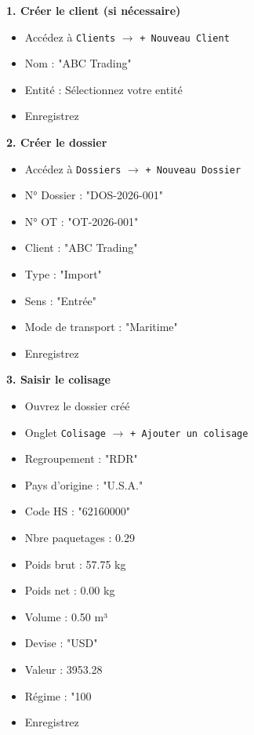 \documentclass[12pt,a4paper]{report}
\begin{document}
\textbf{1. Créer le client (si nécessaire)}

\begin{itemize}[leftmargin=*]
    \item Accédez à \texttt{Clients} $\rightarrow$ \texttt{+ Nouveau Client}
    \item Nom : "ABC Trading"
    \item Entité : Sélectionnez votre entité
    \item Enregistrez
\end{itemize}

\textbf{2. Créer le dossier}

\begin{itemize}[leftmargin=*]
    \item Accédez à \texttt{Dossiers} $\rightarrow$ \texttt{+ Nouveau Dossier}
    \item N° Dossier : "DOS-2026-001"
    \item N° OT : "OT-2026-001"
    \item Client : "ABC Trading"
    \item Type : "Import"
    \item Sens : "Entrée"
    \item Mode de transport : "Maritime"
    \item Enregistrez
\end{itemize}

\textbf{3. Saisir le colisage}

\begin{itemize}[leftmargin=*]
    \item Ouvrez le dossier créé
    \item Onglet \texttt{Colisage} $\rightarrow$ \texttt{+ Ajouter un colisage}
    \item Regroupement : "RDR"
    \item Pays d'origine : "U.S.A."
    \item Code HS : "62160000"
    \item Nbre paquetages : 0.29
    \item Poids brut : 57.75 kg
    \item Poids net : 0.00 kg
    \item Volume : 0.50 m³
    \item Devise : "USD"
    \item Valeur : 3953.28
    \item Régime : "100%
    \item Enregistrez
\end{itemize}
\end{document}
